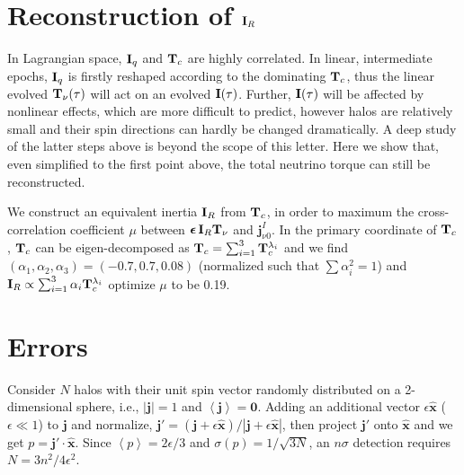 \documentclass[aps,prd,twocolumn,amsmath,amssymb,amsfont,superscriptaddress,nofootinbib]{revtex4-1}
\newcommand{\bs}{\boldsymbol}
\newcommand{\T}{\bold{T}}
\newcommand{\I}{\bold{I}}
\newcommand{\spin}{\bs{j}}
\begin{document}

\appendix
\section{Reconstruction of $\I_R$}\label{app.I}
In Lagrangian space, $\I_q$ and $\T_c$ are highly correlated.
In linear, intermediate epochs, $\I_q$ is firstly reshaped according to the dominating $\T_c$, thus the linear evolved $\T_\nu(\tau)$ will act on an evolved $\I(\tau)$.
Further, $\I(\tau)$ will be affected by nonlinear effects, which are more difficult to predict, however halos are relatively small and their spin directions can hardly be changed dramatically.
A deep study of the latter steps above is beyond the scope of this letter. Here we show that, even simplified to the first point above, the total neutrino torque can still be reconstructed.

We construct an equivalent inertia $\I_R$ from $\T_c$, in order to maximum the cross-correlation coefficient $\mu$ between $\bs{\epsilon}\,\I_R\T_\nu$ and $\spin^I_{\nu 0}$.
In the primary coordinate of $\T_c$, $\T_c$ can be eigen-decomposed as $\T_c=\sum_{i=1}^3\T^{\lambda_i}_c$ and we find $(\alpha_1,\alpha_2,\alpha_3)=(-0.7,0.7,0.08)$ (normalized such that $\sum \alpha_i^2=1$) and $\I_R\propto\sum_{i=1}^3\alpha_i\T^{\lambda_i}_c$
optimize $\mu$ to be 0.19.


\section{Errors}\label{app.error}
Consider $N$ halos with their unit spin vector randomly distributed on a 2-dimensional sphere, i.e., $|\spin|=1$ and $\left\langle \spin \right\rangle =\bs{0}$. Adding an additional vector $\epsilon\hat{\bs{x}}$ ($\epsilon\ll 1$) to $\spin$ and normalize, $\spin'=(\spin+\epsilon\hat{\bs{x}})/|\spin+\epsilon\hat{\bs{x}}|$, then project $\spin'$ onto $\hat{\bs{x}}$ and we get $p=\spin'\cdot\hat{\bs{x}}$. Since $\left\langle p \right\rangle=2\epsilon/3$ and $\sigma(p)=1/\sqrt{3N}$, an $n\sigma$ detection requires $N=3n^2/4\epsilon^2$.





\end{document}
